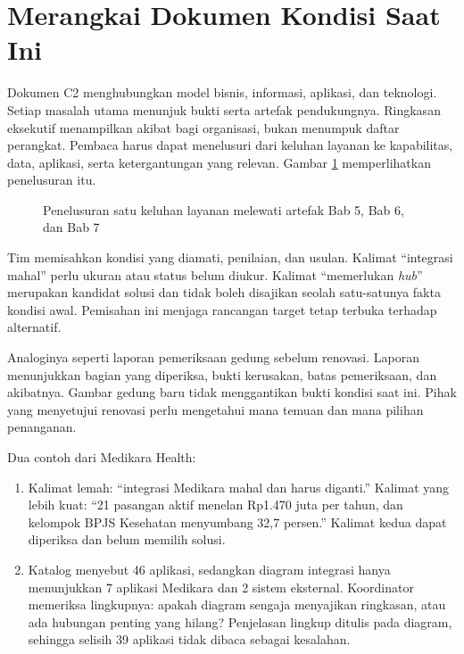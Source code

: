 \section{Merangkai Dokumen Kondisi Saat Ini}

Dokumen C2 menghubungkan model bisnis, informasi, aplikasi, dan teknologi. Setiap masalah utama menunjuk bukti serta artefak pendukungnya.
Ringkasan eksekutif menampilkan akibat bagi organisasi, bukan menumpuk daftar perangkat. Pembaca harus dapat menelusuri dari keluhan layanan ke
kapabilitas, data, aplikasi, serta ketergantungan yang relevan. Gambar \ref{fig:ch07-rantai-c2} memperlihatkan penelusuran itu.

\begin{figure}[!htb]
  \centering
  
  \caption{Penelusuran satu keluhan layanan melewati artefak Bab 5, Bab 6, dan Bab 7}
  \label{fig:ch07-rantai-c2}
\end{figure}

Tim memisahkan kondisi yang diamati, penilaian, dan usulan. Kalimat ``integrasi mahal'' perlu ukuran atau status belum diukur. Kalimat ``memerlukan
\textit{hub}'' merupakan kandidat solusi dan tidak boleh disajikan seolah satu-satunya fakta kondisi awal. Pemisahan ini menjaga rancangan target
tetap terbuka terhadap alternatif.

Analoginya seperti laporan pemeriksaan gedung sebelum renovasi. Laporan menunjukkan bagian yang diperiksa, bukti kerusakan, batas pemeriksaan, dan
akibatnya. Gambar gedung baru tidak menggantikan bukti kondisi saat ini. Pihak yang menyetujui renovasi perlu mengetahui mana temuan dan mana pilihan
penanganan.

Dua contoh dari Medikara Health:

\begin{enumerate}
  \item Kalimat lemah: ``integrasi Medikara mahal dan harus diganti.'' Kalimat yang lebih kuat: ``21 pasangan aktif menelan Rp1.470 juta per tahun, dan
        kelompok BPJS Kesehatan menyumbang 32,7 persen.'' Kalimat kedua dapat diperiksa dan belum memilih solusi.
  \item Katalog menyebut 46 aplikasi, sedangkan diagram integrasi hanya menunjukkan 7 aplikasi Medikara dan 2 sistem eksternal. Koordinator memeriksa
        lingkupnya: apakah diagram sengaja menyajikan ringkasan, atau ada hubungan penting yang hilang? Penjelasan lingkup ditulis pada diagram, sehingga
        selisih 39 aplikasi tidak dibaca sebagai kesalahan.
\end{enumerate}

